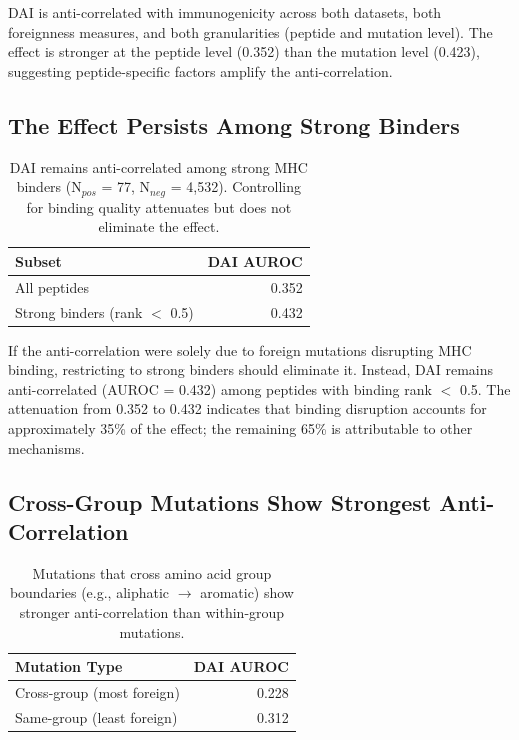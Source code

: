 \documentclass[11pt,twocolumn]{article}
\begin{document}
DAI is anti-correlated with immunogenicity across both datasets, both foreignness measures, and both granularities (peptide and mutation level). The effect is stronger at the peptide level (0.352) than the mutation level (0.423), suggesting peptide-specific factors amplify the anti-correlation.

\subsection{The Effect Persists Among Strong Binders}

\begin{table}[ht]
\centering
\footnotesize
\begin{tabular}{@{}lr@{}}
\toprule
Subset & DAI AUROC \\
\midrule
All peptides & 0.352 \\
Strong binders (rank $<$ 0.5) & 0.432 \\
\bottomrule
\end{tabular}
\caption{DAI remains anti-correlated among strong MHC binders (N$_{pos}$ = 77, N$_{neg}$ = 4,532). Controlling for binding quality attenuates but does not eliminate the effect.}
\end{table}

If the anti-correlation were solely due to foreign mutations disrupting MHC binding, restricting to strong binders should eliminate it. Instead, DAI remains anti-correlated (AUROC = 0.432) among peptides with binding rank $<$ 0.5. The attenuation from 0.352 to 0.432 indicates that binding disruption accounts for approximately 35\% of the effect; the remaining 65\% is attributable to other mechanisms.

\subsection{Cross-Group Mutations Show Strongest Anti-Correlation}

\begin{table}[ht]
\centering
\footnotesize
\begin{tabular}{@{}lr@{}}
\toprule
Mutation Type & DAI AUROC \\
\midrule
Cross-group (most foreign) & 0.228 \\
Same-group (least foreign) & 0.312 \\
\bottomrule
\end{tabular}
\caption{Mutations that cross amino acid group boundaries (e.g., aliphatic $\to$ aromatic) show stronger anti-correlation than within-group mutations.}
\end{table}
\end{document}
